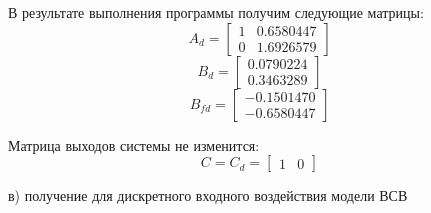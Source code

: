 \documentclass[a4paper,14pt]{extreport}
\begin{document}
В результате выполнения программы получим следующие матрицы:
\begin{equation}
A_d=
\begin{bmatrix}
1 &   0.6580447\\  
0&    1.6926579  
\end{bmatrix}
\end{equation}
\begin{equation}
B_d=
\begin{bmatrix}
0.0790224 \\
0.3463289 
\end{bmatrix}
\end{equation}
\begin{equation}
B_{fd} =
\begin{bmatrix}
- 0.1501470\\
- 0.6580447
\end{bmatrix}
\end{equation}

Матрица выходов системы не изменится:
\begin{equation}
C = C_d =
\begin{bmatrix}
1&0
\end{bmatrix}
\end{equation}


в) получение для дискретного входного воздействия модели ВСВ
\end{document}
